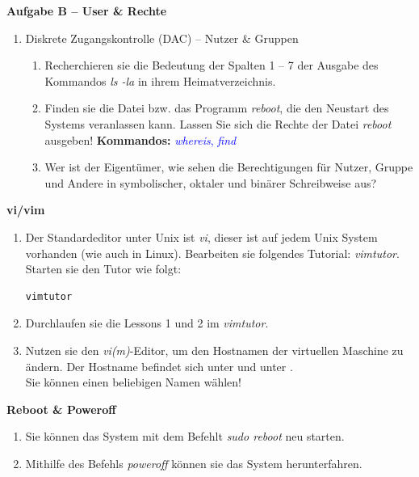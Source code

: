 \documentclass[paper=a4,fontsize=11pt]{scrartcl}%
\numberwithin{equation}{section}
\begin{document}
\begin{center}\Large{\textbf{Aufgabe B -- User \& Rechte}}\end{center}\vskip0.25in
\begin{enumerate}
\item Diskrete Zugangskontrolle (DAC) -- Nutzer \& Gruppen
	\begin{enumerate}[label=(\alph*)]
        \item Recherchieren sie die Bedeutung der Spalten 1 -- 7 der Ausgabe des Kommandos \emph{ls -la} in ihrem Heimatverzeichnis.
        \item Finden sie die Datei bzw. das Programm \textit{reboot}, die den Neustart des Systems veranlassen kann. Lassen Sie sich die Rechte der Datei \textit{reboot} ausgeben!
        \textbf{Kommandos:} \textcolor{blue}{\emph{whereis}, \emph{find}}
        \item Wer ist der Eigentümer, wie sehen die Berechtigungen für Nutzer, Gruppe und Andere in symbolischer, oktaler und binärer Schreibweise aus?
  \end{enumerate}
\end{enumerate}
\begin{center}\Large{\textbf{vi/vim}}\end{center}\vskip0.25in
\begin{enumerate}
	\item Der Standardeditor unter Unix ist \emph{vi}, dieser ist auf jedem Unix System vorhanden (wie auch in Linux). Bearbeiten sie folgendes Tutorial: \emph{vimtutor}. Starten sie den Tutor wie folgt:
	\begin{lstlisting}[style=Bash, language=Bash]
vimtutor
\end{lstlisting}
	\item Durchlaufen sie die Lessons 1 und 2 im \emph{vimtutor}.
	\item Nutzen sie den \emph{vi(m)}-Editor, um den Hostnamen der virtuellen Maschine zu ändern. Der Hostname befindet sich unter  und unter .\\
	Sie können einen beliebigen Namen wählen!
\end{enumerate}

\begin{center}\Large{\textbf{Reboot \& Poweroff}}\end{center}\vskip0.25in
\begin{enumerate}
	\item Sie können das System mit dem Befehlt \emph{sudo reboot} neu starten.
	\item Mithilfe des Befehls \emph{poweroff} können sie das System herunterfahren.
\end{enumerate}
\end{document}
